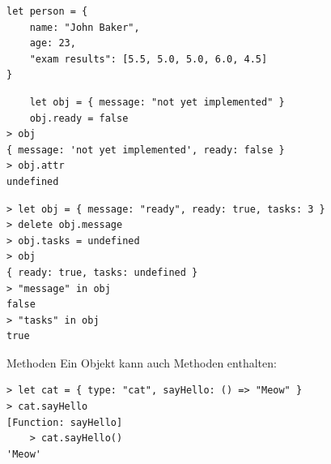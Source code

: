 \begin{verbatim}
let person = {
    name: "John Baker",
    age: 23,
    "exam results": [5.5, 5.0, 5.0, 6.0, 4.5]
}
\end{verbatim}

\begin{verbatim}
    let obj = { message: "not yet implemented" }
    obj.ready = false
> obj
{ message: 'not yet implemented', ready: false }
> obj.attr
undefined
\end{verbatim}

\begin{verbatim}
> let obj = { message: "ready", ready: true, tasks: 3 }
> delete obj.message
> obj.tasks = undefined
> obj
{ ready: true, tasks: undefined }
> "message" in obj
false
> "tasks" in obj
true
\end{verbatim}

\begin{definition}{Methoden}
    Ein Objekt kann auch Methoden enthalten:
\end{definition}

\begin{verbatim}
> let cat = { type: "cat", sayHello: () => "Meow" }
> cat.sayHello
[Function: sayHello]
    > cat.sayHello()
'Meow'
\end{verbatim}

